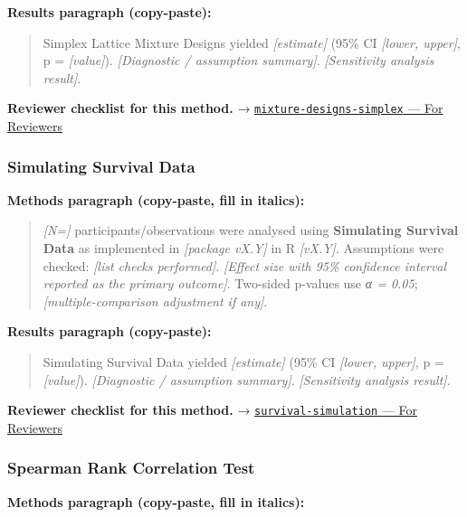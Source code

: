 \documentclass[
]{article}
\begin{document}
\textbf{Results paragraph (copy-paste):}

\begin{quote}
Simplex Lattice Mixture Designs yielded \emph{{[}estimate{]}} (95\% CI
\emph{{[}lower, upper{]}}, p = \emph{{[}value{]}}). \emph{{[}Diagnostic
/ assumption summary{]}}. \emph{{[}Sensitivity analysis result{]}}.
\end{quote}

\textbf{Reviewer checklist for this method.} →
\href{../chapters/16-design/mixture-designs-simplex.Rmd\#for-reviewers}{\texttt{mixture-designs-simplex}
--- For Reviewers}

\subsubsection{Simulating Survival Data}\label{simulating-survival-data}

\textbf{Methods paragraph (copy-paste, fill in italics):}

\begin{quote}
\emph{{[}N={]}} participants/observations were analysed using
\textbf{Simulating Survival Data} as implemented in \emph{{[}package
vX.Y{]}} in R \emph{{[}vX.Y{]}}. Assumptions were checked: \emph{{[}list
checks performed{]}}. \emph{{[}Effect size with 95\% confidence interval
reported as the primary outcome{]}}. Two-sided p-values use \emph{α =
0.05}; \emph{{[}multiple-comparison adjustment if any{]}}.
\end{quote}

\textbf{Results paragraph (copy-paste):}

\begin{quote}
Simulating Survival Data yielded \emph{{[}estimate{]}} (95\% CI
\emph{{[}lower, upper{]}}, p = \emph{{[}value{]}}). \emph{{[}Diagnostic
/ assumption summary{]}}. \emph{{[}Sensitivity analysis result{]}}.
\end{quote}

\textbf{Reviewer checklist for this method.} →
\href{../chapters/11-survival/survival-simulation.Rmd\#for-reviewers}{\texttt{survival-simulation}
--- For Reviewers}

\subsubsection{Spearman Rank Correlation
Test}\label{spearman-rank-correlation-test}

\textbf{Methods paragraph (copy-paste, fill in italics):}
\end{document}
